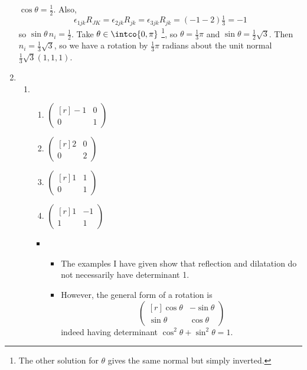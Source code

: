 \documentclass[fleqn,a4paper,11pt]{article}
\begin{document}
\begin{enumerate}[label=\textbf{\arabic*.}]
    \(\cos \theta = \frac 12\). Also,
    \begin{equation*}
     \epsilon_{1jk} R_{JK} = \epsilon_{2jk} R_{jk} = \epsilon_{3jk} R_{jk}
      = (-1 - 2) \tfrac 13 = -1
    \end{equation*}
    so \(\sin\theta\,n_i = \frac 12\). Take \(\theta \in \intco{0, \pi}\)
    \footnote{
    The other solution for \(\theta\) gives the same normal but simply inverted.
    }, so
    \(\theta = \frac 13 \pi\) and \(\sin\theta = \frac 12 \sqrt 3\). Then
    \(n_i = \frac 13 \sqrt 3\), so we have a rotation by \(\frac 13 \pi\)
    radians about the unit normal \(\frac 13 \sqrt 3(1, 1, 1)\).
   \item
    \begin{enumerate}[label=(\alph*)]
     \item
      \begin{enumerate}[label=(\roman*)]
       \item \(
        \begin{pmatrix*}[r]
         -1 & 0 \\
         0 & 1
        \end{pmatrix*} \)
       \item \(
        \begin{pmatrix*}[r]
         2 & 0 \\
         0 & 2
        \end{pmatrix*} \)
       \item \(
        \begin{pmatrix*}[r]
         1 & 1 \\
         0 & 1
        \end{pmatrix*} \)
       \item \(
        \begin{pmatrix*}[r]
         1 & -1 \\
         1 & 1
        \end{pmatrix*} \)
      \end{enumerate}
      \begin{itemize}
       \item
        \begin{itemize}
         \item The examples I have given show that reflection and dilatation do
               not necessarily have determinant 1.

         \item
          However, the general form of a rotation is
          \begin{equation*}
           \begin{pmatrix*}[r]
            \cos \theta & -\sin \theta \\
            \sin \theta & \cos \theta
           \end{pmatrix*}
          \end{equation*}
          indeed having determinant \(\cos^2 \theta + \sin^2 \theta = 1\).


\end{itemize}
\end{itemize}
\end{enumerate}
\end{enumerate}
\end{document}
